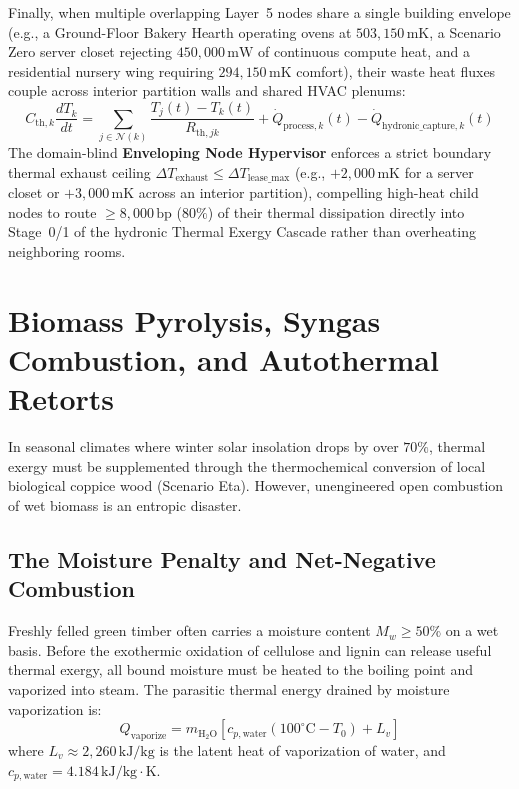 Finally, when multiple overlapping Layer~5 nodes share a single building envelope (e.g., a Ground-Floor Bakery Hearth operating ovens at $503{,}150\,\mathrm{mK}$, a Scenario Zero server closet rejecting $450{,}000\,\mathrm{mW}$ of continuous compute heat, and a residential nursery wing requiring $294{,}150\,\mathrm{mK}$ comfort), their waste heat fluxes couple across interior partition walls and shared HVAC plenums:
\begin{equation}
C_{\mathrm{th},k} \frac{dT_k}{dt} = \sum_{j \in \mathcal{N}(k)} \frac{T_j(t) - T_k(t)}{R_{\mathrm{th},jk}} + \dot{Q}_{\mathrm{process},k}(t) - \dot{Q}_{\mathrm{hydronic\_capture},k}(t)
\label{eq:enveloping_node_thermal_coupling}
\end{equation}
The domain-blind \textbf{Enveloping Node Hypervisor} enforces a strict boundary thermal exhaust ceiling $\Delta T_{\mathrm{exhaust}} \le \Delta T_{\mathrm{lease\_max}}$ (e.g., $+2{,}000\,\mathrm{mK}$ for a server closet or $+3{,}000\,\mathrm{mK}$ across an interior partition), compelling high-heat child nodes to route $\ge 8{,}000\,\mathrm{bp}$ ($80\%$) of their thermal dissipation directly into Stage~0/1 of the hydronic Thermal Exergy Cascade rather than overheating neighboring rooms.

\section{Biomass Pyrolysis, Syngas Combustion, and Autothermal Retorts}
\label{sec:th_pyrolysis}

In seasonal climates where winter solar insolation drops by over $70\%$, thermal exergy must be supplemented through the thermochemical conversion of local biological coppice wood (Scenario Eta). However, unengineered open combustion of wet biomass is an entropic disaster.

\subsection{The Moisture Penalty and Net-Negative Combustion}
Freshly felled green timber often carries a moisture content $M_w \ge 50\%$ on a wet basis. Before the exothermic oxidation of cellulose and lignin can release useful thermal exergy, all bound moisture must be heated to the boiling point and vaporized into steam. The parasitic thermal energy drained by moisture vaporization is:
\begin{equation}
Q_{\mathrm{vaporize}} = m_{\mathrm{H_2O}} \left[ c_{p,\mathrm{water}} (100^\circ\mathrm{C} - T_0) + L_v \right]
\label{eq:moisture_penalty_calc}
\end{equation}
where $L_v \approx 2,260\,\mathrm{kJ/kg}$ is the latent heat of vaporization of water, and $c_{p,\mathrm{water}} = 4.184\,\mathrm{kJ/kg\cdot K}$.

